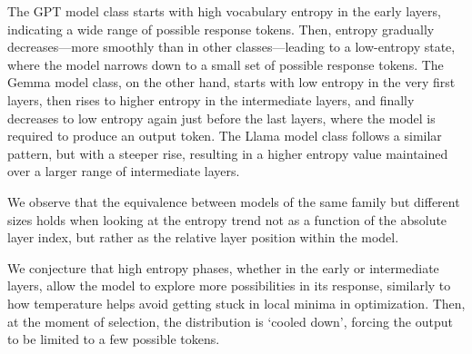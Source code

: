 The GPT model class starts with high vocabulary entropy in the early layers, indicating a wide range of possible response tokens. Then, entropy gradually decreases—more smoothly than in other classes—leading to a low-entropy state, where the model narrows down to a small set of possible response tokens. \newline
The Gemma model class, on the other hand, starts with low entropy in the very first layers, then rises to higher entropy in the intermediate layers, and finally decreases to low entropy again just before the last layers, where the model is required to produce an output token. \newline
The Llama model class follows a similar pattern, but with a steeper rise, resulting in a higher entropy value maintained over a larger range of intermediate layers.

We observe that the equivalence between models of the same family but different sizes holds when looking at the entropy trend not as a function of the absolute layer index, but rather as the relative layer position within the model.

We conjecture that high entropy phases, whether in the early or intermediate layers, allow the model to explore more possibilities in its response, similarly to how temperature helps avoid getting stuck in local minima in optimization. Then, at the moment of selection, the distribution is `cooled down', forcing the output to be limited to a few possible tokens.

